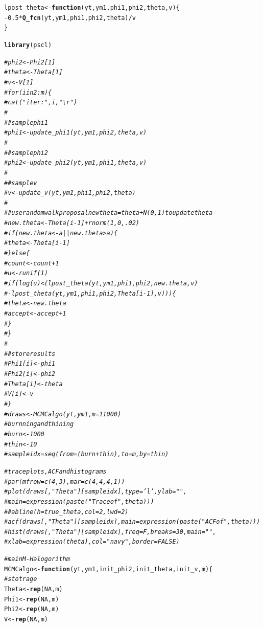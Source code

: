 \documentclass[12pt]{article}\usepackage[]{graphicx}\usepackage[]{color}
\makeatletter
\newcommand{\hlnum}[1]{\textcolor[rgb]{0.686,0.059,0.569}{#1}}%
\newcommand{\hlcom}[1]{\textcolor[rgb]{0.678,0.584,0.686}{\textit{#1}}}%
\newcommand{\hlopt}[1]{\textcolor[rgb]{0,0,0}{#1}}%
\newcommand{\hlstd}[1]{\textcolor[rgb]{0.345,0.345,0.345}{#1}}%
\newcommand{\hlkwa}[1]{\textcolor[rgb]{0.161,0.373,0.58}{\textbf{#1}}}%
\newcommand{\hlkwb}[1]{\textcolor[rgb]{0.69,0.353,0.396}{#1}}%
\newcommand{\hlkwc}[1]{\textcolor[rgb]{0.333,0.667,0.333}{#1}}%
\newcommand{\hlkwd}[1]{\textcolor[rgb]{0.737,0.353,0.396}{\textbf{#1}}}%
\newenvironment{kframe}{%
 \def\at@end@of@kframe{}%
 \ifinner\ifhmode%
  \def\at@end@of@kframe{\end{minipage}}%
  \begin{minipage}{\columnwidth}%
 \fi\fi%
 \def\FrameCommand##1{\hskip\@totalleftmargin \hskip-\fboxsep
 \colorbox{shadecolor}{##1}\hskip-\fboxsep
     \hskip-\linewidth \hskip-\@totalleftmargin \hskip\columnwidth}%
 \MakeFramed {\advance\hsize-\width
   \@totalleftmargin\z@ \linewidth\hsize
   \@setminipage}}%
 {\par\unskip\endMakeFramed%
 \at@end@of@kframe}
\newenvironment{knitrout}{}{} %
\makeatother
\begin{document}
\begin{knitrout}
\begin{kframe}
\begin{alltt}
\hlstd{lpost_theta} \hlkwb{<-} \hlkwa{function}\hlstd{(}\hlkwc{yt}\hlstd{,} \hlkwc{ym1}\hlstd{,} \hlkwc{phi1}\hlstd{,} \hlkwc{phi2}\hlstd{,} \hlkwc{theta}\hlstd{,} \hlkwc{v}\hlstd{)\{}
    \hlopt{-}\hlnum{0.5} \hlopt{*} \hlkwd{Q_fcn}\hlstd{(yt, ym1, phi1, phi2, theta)} \hlopt{/} \hlstd{v}
\hlstd{\}}

\hlkwd{library}\hlstd{(pscl)}

\hlcom{# phi2 <- Phi2[1]}
\hlcom{# theta <- Theta[1]}
\hlcom{# v <- V[1]}
\hlcom{# for (i in 2:m) \{ }
\hlcom{#     cat("iter:", i, "\textbackslash{}r")}
\hlcom{#     }
\hlcom{#     # sample phi1 }
\hlcom{#     phi1 <- update_phi1(yt, ym1, phi2, theta, v)}
\hlcom{#     }
\hlcom{#     # sample phi2}
\hlcom{#     phi2 <- update_phi2(yt, ym1, phi1, theta, v)}
\hlcom{#     }
\hlcom{#     # sample v}
\hlcom{#     v <- update_v(yt, ym1, phi1, phi2, theta)}
\hlcom{#     }
\hlcom{#     # use random walk proposal newtheta = theta + N(0, 1) to update theta}
\hlcom{#     new.theta <- Theta[i - 1] + rnorm(1, 0, .02)}
\hlcom{#     if (new.theta < -a || new.theta > a) \{}
\hlcom{#         theta <- Theta[i - 1]}
\hlcom{#     \} else \{}
\hlcom{#         count <- count + 1}
\hlcom{#         u <- runif(1)}
\hlcom{#         if (log(u) < (lpost_theta(yt, ym1, phi1, phi2, new.theta, v)}
\hlcom{#                      - lpost_theta(yt, ym1, phi1, phi2, Theta[i - 1], v))) \{}
\hlcom{#             theta <- new.theta}
\hlcom{#             accept <- accept + 1}
\hlcom{#         \}}
\hlcom{#     \}}
\hlcom{#     }
\hlcom{#     # store results}
\hlcom{#     Phi1[i] <- phi1}
\hlcom{#     Phi2[i] <- phi2}
\hlcom{#     Theta[i] <- theta}
\hlcom{#     V[i] <- v}
\hlcom{# \}}
\hlcom{# draws <- MCMCalgo(yt, ym1, m = 11000)}
\hlcom{# burnning and thining}
\hlcom{# burn <- 1000}
\hlcom{# thin <- 10}
\hlcom{# sampleidx = seq(from = (burn + thin), to = m, by = thin)}

\hlcom{# trace plots, ACF and histograms}
\hlcom{# par(mfrow = c(4, 3), mar = c(4, 4, 4, 1))}
\hlcom{# plot(draws[, "Theta"][sampleidx], type = 'l', ylab = "", }
\hlcom{#      main = expression(paste("Trace of ", theta)))}
\hlcom{# # abline(h = true_theta, col = 2, lwd = 2)}
\hlcom{# acf(draws[, "Theta"][sampleidx], main = expression(paste("ACF of ", theta)))}
\hlcom{# hist(draws[,"Theta"][sampleidx], freq = F, breaks = 30, main = "",}
\hlcom{#      xlab = expression(theta), col = "navy", border = FALSE)}

\hlcom{# main M-H alogorithm}
\hlstd{MCMCalgo} \hlkwb{<-} \hlkwa{function}\hlstd{(}\hlkwc{yt}\hlstd{,} \hlkwc{ym1}\hlstd{,} \hlkwc{init_phi2}\hlstd{,} \hlkwc{init_theta}\hlstd{,} \hlkwc{init_v}\hlstd{,} \hlkwc{m}\hlstd{) \{}
    \hlcom{# stotrage}
    \hlstd{Theta} \hlkwb{<-} \hlkwd{rep}\hlstd{(}\hlnum{NA}\hlstd{, m)}
    \hlstd{Phi1} \hlkwb{<-} \hlkwd{rep}\hlstd{(}\hlnum{NA}\hlstd{, m)}
    \hlstd{Phi2} \hlkwb{<-} \hlkwd{rep}\hlstd{(}\hlnum{NA}\hlstd{, m)}
    \hlstd{V} \hlkwb{<-} \hlkwd{rep}\hlstd{(}\hlnum{NA}\hlstd{, m)}


\end{alltt}
\end{kframe}
\end{knitrout}
\end{document}
